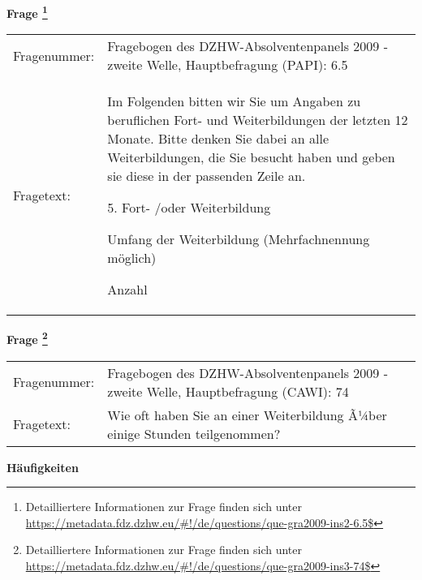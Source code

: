 				\vspace*{0.5cm}
                \noindent\textbf{Frage
	                \footnote{Detailliertere Informationen zur Frage finden sich unter
		              \url{https://metadata.fdz.dzhw.eu/\#!/de/questions/que-gra2009-ins2-6.5$}}}\\
				\begin{tabularx}{\hsize}{@{}lX}
					Fragenummer: &
					  Fragebogen des DZHW-Absolventenpanels 2009 - zweite Welle, Hauptbefragung (PAPI):
					  6.5
 \\
					Fragetext: & Im Folgenden bitten wir Sie um Angaben zu beruflichen Fort- und Weiterbildungen der letzten 12 Monate. Bitte denken Sie dabei an alle Weiterbildungen, die Sie besucht haben und geben sie diese in der passenden Zeile an.\par  5. Fort- /oder Weiterbildung\par  Umfang der Weiterbildung (Mehrfachnennung möglich)\par  Anzahl \\
				\end{tabularx}
				\vspace*{0.5cm}
                \noindent\textbf{Frage
	                \footnote{Detailliertere Informationen zur Frage finden sich unter
		              \url{https://metadata.fdz.dzhw.eu/\#!/de/questions/que-gra2009-ins3-74$}}}\\
				\begin{tabularx}{\hsize}{@{}lX}
					Fragenummer: &
					  Fragebogen des DZHW-Absolventenpanels 2009 - zweite Welle, Hauptbefragung (CAWI):
					  74
 \\
					Fragetext: & Wie oft haben Sie an einer Weiterbildung Ã¼ber einige Stunden teilgenommen? \\
				\end{tabularx}





        		\vspace*{0.5cm}
                \noindent\textbf{Häufigkeiten}

